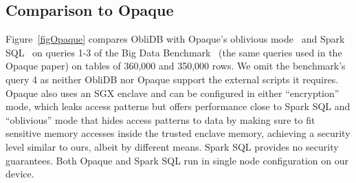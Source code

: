 \documentclass[letterpaper,twocolumn,10pt]{article}
\def\name/{ObliDB}
\begin{document}
\subsection{Comparison to Opaque}

Figure~\ref{figOpaque} compares \name/ with Opaque's oblivious mode~\cite{ZDB+17} and Spark SQL~\cite{SparkSQL} on queries 1-3 of the Big Data Benchmark~\cite{BDB} (the same queries used in the Opaque paper) on tables of 360,000 and 350,000 rows. We omit the benchmark's query 4 as neither \name/ nor Opaque support the external scripts it requires. Opaque also uses an SGX enclave and can be configured in either ``encryption'' mode, which leaks access patterns but offers performance close to Spark SQL and ``oblivious'' mode that hides access patterns to data by making sure to fit sensitive memory accesses inside the trusted enclave memory, achieving a security level similar to ours, albeit by different means. Spark SQL provides no security guarantees. Both Opaque and Spark SQL run in single node configuration on our device.
\end{document}
